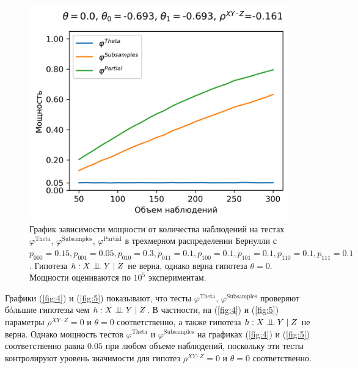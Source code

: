 \begin{figure}[H]
    \centering
    \includegraphics[scale=0.55]{images/graph5.png}
    \caption{График зависимости мощности от количества наблюдений
    на тестах $\varphi^{\text{Theta}}$, $\varphi^{\text{Subsamples}}$, $\varphi^{\text{Partial}}$
    в трехмерном распределении Бернулли с $p_{000}=0.15, p_{001}=0.05, 
    p_{010}=0.3, p_{011}=0.1,
    p_{100}=0.1, p_{101}=0.1, p_{110}=0.1, p_{111}=0.1$. 
    Гипотеза $h: X \perp\!\!\!\perp Y \mid Z$ не верна, однако верна гипотеза $\theta=0$.
    Мощности оцениваются по $10^5$ экспериментам.} \label{fig:5}
\end{figure}

Графики (\autoref{fig:4}) и (\autoref{fig:5}) показывают, что тесты 
$\varphi^{\text{Theta}}$, $\varphi^{\text{Subsamples}}$
проверяют бóльшие гипотезы чем $h: X \perp\!\!\!\perp Y \mid Z$.
В частности, на (\autoref{fig:4}) и (\autoref{fig:5})
параметры $\rho^{XY\cdot Z}=0$ и $\theta=0$ соответственно, а также гипотеза
$h: X \perp\!\!\!\perp Y \mid Z$ не верна.
Однако мощность тестов 
$\varphi^{\text{Theta}}$ и $\varphi^{\text{Subsamples}}$
на графиках (\autoref{fig:4}) и (\autoref{fig:5}) соответственно
равна $0.05$
при любом объеме наблюдений, поскольку эти тесты контролируют
уровень значимости для гипотез $\rho^{XY\cdot Z}=0$ и $\theta=0$
соответственно.

